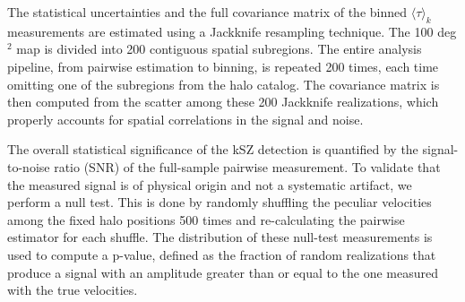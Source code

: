 \documentclass[]{article}
\begin{document}
The statistical uncertainties and the full covariance matrix of the binned $\langle \tau \rangle_k$ measurements are estimated using a Jackknife resampling technique. The 100 deg$^2$ map is divided into 200 contiguous spatial subregions. The entire analysis pipeline, from pairwise estimation to binning, is repeated 200 times, each time omitting one of the subregions from the halo catalog. The covariance matrix is then computed from the scatter among these 200 Jackknife realizations, which properly accounts for spatial correlations in the signal and noise.

The overall statistical significance of the kSZ detection is quantified by the signal-to-noise ratio (SNR) of the full-sample pairwise measurement. To validate that the measured signal is of physical origin and not a systematic artifact, we perform a null test. This is done by randomly shuffling the peculiar velocities among the fixed halo positions 500 times and re-calculating the pairwise estimator for each shuffle. The distribution of these null-test measurements is used to compute a p-value, defined as the fraction of random realizations that produce a signal with an amplitude greater than or equal to the one measured with the true velocities.
\end{document}
